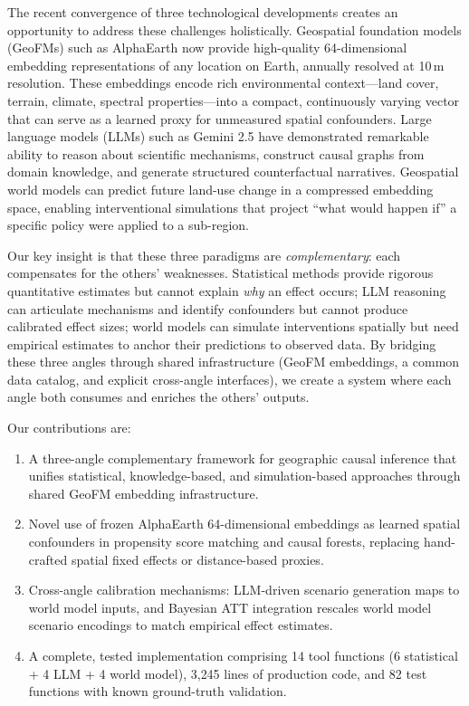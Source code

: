 \documentclass{article}
\begin{document}
The recent convergence of three technological developments creates an opportunity to address these challenges holistically. Geospatial foundation models (GeoFMs) such as AlphaEarth \citep{brown2025alphaearth} now provide high-quality 64-dimensional embedding representations of any location on Earth, annually resolved at 10\,m resolution. These embeddings encode rich environmental context---land cover, terrain, climate, spectral properties---into a compact, continuously varying vector that can serve as a learned proxy for unmeasured spatial confounders. Large language models (LLMs) such as Gemini 2.5 \citep{team2024gemini} have demonstrated remarkable ability to reason about scientific mechanisms, construct causal graphs from domain knowledge, and generate structured counterfactual narratives. Geospatial world models \citep{zhou2026worldmodel} can predict future land-use change in a compressed embedding space, enabling interventional simulations that project ``what would happen if'' a specific policy were applied to a sub-region.

Our key insight is that these three paradigms are \textit{complementary}: each compensates for the others' weaknesses. Statistical methods provide rigorous quantitative estimates but cannot explain \textit{why} an effect occurs; LLM reasoning can articulate mechanisms and identify confounders but cannot produce calibrated effect sizes; world models can simulate interventions spatially but need empirical estimates to anchor their predictions to observed data. By bridging these three angles through shared infrastructure (GeoFM embeddings, a common data catalog, and explicit cross-angle interfaces), we create a system where each angle both consumes and enriches the others' outputs.

Our contributions are:

\begin{enumerate}
\item A three-angle complementary framework for geographic causal inference that unifies statistical, knowledge-based, and simulation-based approaches through shared GeoFM embedding infrastructure.

\item Novel use of frozen AlphaEarth 64-dimensional embeddings as learned spatial confounders in propensity score matching and causal forests, replacing hand-crafted spatial fixed effects or distance-based proxies.

\item Cross-angle calibration mechanisms: LLM-driven scenario generation maps to world model inputs, and Bayesian ATT integration rescales world model scenario encodings to match empirical effect estimates.

\item A complete, tested implementation comprising 14 tool functions (6 statistical + 4 LLM + 4 world model), 3{,}245 lines of production code, and 82 test functions with known ground-truth validation.
\end{enumerate}
\end{document}
